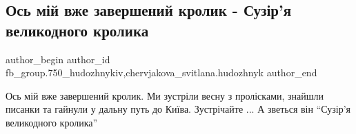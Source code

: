  
 
 
 
 

\subsection{Ось мій вже завершений кролик - Сузір'я великодного кролика}
\label{sec:29_03_2018.fb.fb_group.750_hudozhnykiv.1.zavershenyj_krolik_suzirja}
 
\ifcmt
 author_begin
   author_id fb_group.750_hudozhnykiv,chervjakova_svitlana.hudozhnyk
 author_end
\fi

Ось мій вже завершений кролик. Ми зустріли весну з пролісками, знайшли писанки
та гайнули у дальну путь до Київа. Зустрічайте ... А зветься він \enquote{Сузір'я
великодного кролика}


